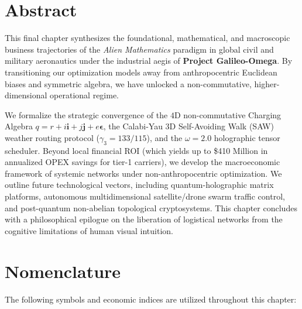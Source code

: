\documentclass[11pt,a4paper]{book}
\begin{document}
\newpage
\section*{Abstract}
This final chapter synthesizes the foundational, mathematical, and macroscopic business trajectories of the \textit{Alien Mathematics} paradigm in global civil and military aeronautics under the industrial aegis of \textbf{Project Galileo-Omega}. By transitioning our optimization models away from anthropocentric Euclidean biases and symmetric algebra, we have unlocked a non-commutative, higher-dimensional operational regime. 

We formalize the strategic convergence of the $4$D non-commutative Charging Algebra $q = r + i\mathbf{i} + j\mathbf{j} + e\bm{\epsilon}$, the Calabi-Yau 3D Self-Avoiding Walk (SAW) weather routing protocol ($\gamma_3 = 133/115$), and the $\omega = 2.0$ holographic tensor scheduler. Beyond local financial ROI (which yields up to \$410 Million in annualized OPEX savings for tier-1 carriers), we develop the macroeconomic framework of systemic networks under non-anthropocentric optimization. We outline future technological vectors, including quantum-holographic matrix platforms, autonomous multidimensional satellite/drone swarm traffic control, and post-quantum non-abelian topological cryptosystems. 
This chapter concludes with a philosophical epilogue on the liberation of logistical networks from the cognitive limitations of human visual intuition.

\clearpage

\section*{Nomenclature}\label{sec:nomenclature}
The following symbols and economic indices are utilized throughout this chapter:
\end{document}
